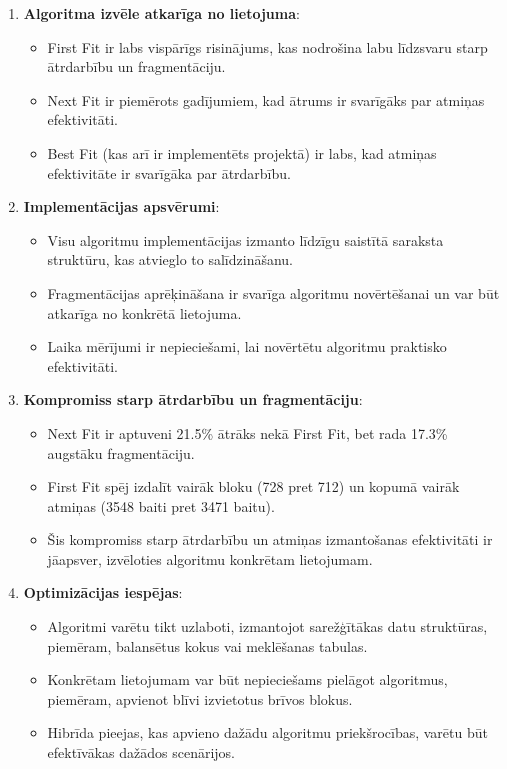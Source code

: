 \documentclass{report}
\begin{document}
	\begin{enumerate}
		\item \textbf{Algoritma izvēle atkarīga no lietojuma}:
		\begin{itemize}
			\item First Fit ir labs vispārīgs risinājums, kas nodrošina labu līdzsvaru starp ātrdarbību un fragmentāciju.
			\item Next Fit ir piemērots gadījumiem, kad ātrums ir svarīgāks par atmiņas efektivitāti.
			\item Best Fit (kas arī ir implementēts projektā) ir labs, kad atmiņas efektivitāte ir svarīgāka par ātrdarbību.
		\end{itemize}
		
		\item \textbf{Implementācijas apsvērumi}:
		\begin{itemize}
			\item Visu algoritmu implementācijas izmanto līdzīgu saistītā saraksta struktūru, kas atvieglo to salīdzināšanu.
			\item Fragmentācijas aprēķināšana ir svarīga algoritmu novērtēšanai un var būt atkarīga no konkrētā lietojuma.
			\item Laika mērījumi ir nepieciešami, lai novērtētu algoritmu praktisko efektivitāti.
		\end{itemize}
		
		\item \textbf{Kompromiss starp ātrdarbību un fragmentāciju}:
		\begin{itemize}
			\item Next Fit ir aptuveni 21.5\% ātrāks nekā First Fit, bet rada 17.3\% augstāku fragmentāciju.
			\item First Fit spēj izdalīt vairāk bloku (728 pret 712) un kopumā vairāk atmiņas (3548 baiti pret 3471 baitu).
			\item Šis kompromiss starp ātrdarbību un atmiņas izmantošanas efektivitāti ir jāapsver, izvēloties algoritmu konkrētam lietojumam.
		\end{itemize}
		
		\item \textbf{Optimizācijas iespējas}:
		\begin{itemize}
			\item Algoritmi varētu tikt uzlaboti, izmantojot sarežģītākas datu struktūras, piemēram, balansētus kokus vai meklēšanas tabulas.
			\item Konkrētam lietojumam var būt nepieciešams pielāgot algoritmus, piemēram, apvienot blīvi izvietotus brīvos blokus.
			\item Hibrīda pieejas, kas apvieno dažādu algoritmu priekšrocības, varētu būt efektīvākas dažādos scenārijos.
		\end{itemize}
		
	\end{enumerate}
	
\end{document}
